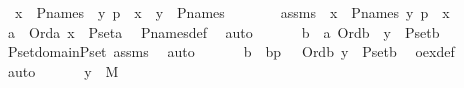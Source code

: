 \begin{isabellebody}
\ \ {\isachardoublequoteopen}x\ {\isasymin}\ P{\isacharunderscore}{\kern0pt}names\ {\isasymLongrightarrow}\ {\isacharless}{\kern0pt}y{\isacharcomma}{\kern0pt}\ p{\isachargreater}{\kern0pt}\ {\isasymin}\ x\ {\isasymLongrightarrow}\ y\ {\isasymin}\ P{\isacharunderscore}{\kern0pt}names{\isachardoublequoteclose}\ \isanewline
%
\isadelimproof
%
\endisadelimproof
%
\isatagproof
{}\isamarkupfalse%
\ {\isacharminus}{\kern0pt}\ \isanewline
\ \ \isamarkupfalse%
\ assms\ {\isacharcolon}{\kern0pt}\ {\isachardoublequoteopen}x\ {\isasymin}\ P{\isacharunderscore}{\kern0pt}names{\isachardoublequoteclose}\ {\isachardoublequoteopen}{\isacharless}{\kern0pt}y{\isacharcomma}{\kern0pt}\ p{\isachargreater}{\kern0pt}\ {\isasymin}\ x{\isachardoublequoteclose}\isanewline
\ \ \isamarkupfalse%
\ \isamarkupfalse%
\ a\ \ {\isachardoublequoteopen}Ord{\isacharparenleft}{\kern0pt}a{\isacharparenright}{\kern0pt}{\isachardoublequoteclose}\ {\isachardoublequoteopen}x\ {\isasymin}\ P{\isacharunderscore}{\kern0pt}set{\isacharparenleft}{\kern0pt}a{\isacharparenright}{\kern0pt}{\isachardoublequoteclose}\ \isamarkupfalse%
\ P{\isacharunderscore}{\kern0pt}names{\isacharunderscore}{\kern0pt}def\ \isamarkupfalse%
\ auto\ \isanewline
\ \ \isamarkupfalse%
\ \isamarkupfalse%
\ {\isachardoublequoteopen}{\isasymexists}b\ {\isacharless}{\kern0pt}\ a{\isachardot}{\kern0pt}\ Ord{\isacharparenleft}{\kern0pt}b{\isacharparenright}{\kern0pt}\ {\isasymand}\ y\ {\isasymin}\ P{\isacharunderscore}{\kern0pt}set{\isacharparenleft}{\kern0pt}b{\isacharparenright}{\kern0pt}{\isachardoublequoteclose}\ \isamarkupfalse%
\ P{\isacharunderscore}{\kern0pt}set{\isacharunderscore}{\kern0pt}domain{\isacharunderscore}{\kern0pt}P{\isacharunderscore}{\kern0pt}set\ assms\ \isamarkupfalse%
\ auto\ \isanewline
\ \ \isamarkupfalse%
\ \isamarkupfalse%
\ b\ \ bp\ {\isacharcolon}{\kern0pt}\ \ {\isachardoublequoteopen}Ord{\isacharparenleft}{\kern0pt}b{\isacharparenright}{\kern0pt}{\isachardoublequoteclose}\ {\isachardoublequoteopen}y\ {\isasymin}\ P{\isacharunderscore}{\kern0pt}set{\isacharparenleft}{\kern0pt}b{\isacharparenright}{\kern0pt}{\isachardoublequoteclose}\ \isamarkupfalse%
\ oex{\isacharunderscore}{\kern0pt}def\ \isamarkupfalse%
\ auto\ \isanewline
\ \ \isamarkupfalse%
\ \isamarkupfalse%
\ {\isachardoublequoteopen}y\ {\isasymin}\ M{\isachardoublequoteclose}\ \isamarkupfalse%

\end{isabellebody}
